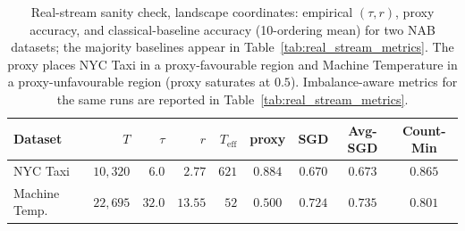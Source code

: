 \documentclass[sensors,article,submit,pdftex,moreauthors]{Definitions/mdpi}
\newcommand{\Teff}{T_{\mathrm{eff}}}
\begin{document}
\begin{table}[t]
\centering
\caption{Real-stream sanity check, landscape coordinates: empirical $(\tau, r)$, proxy accuracy, and classical-baseline accuracy (10-ordering mean) for two NAB datasets; the majority baselines appear in Table~\ref{tab:real_stream_metrics}. The proxy places NYC Taxi in a proxy-favourable region and Machine Temperature in a proxy-unfavourable region (proxy saturates at $0.5$). Imbalance-aware metrics for the same runs are reported in Table~\ref{tab:real_stream_metrics}.}
\label{tab:real_stream}
\begin{tabular}{@{}lrrrrcccc@{}}
\toprule
Dataset & $T$ & $\tau$ & $r$ & $\Teff$ & proxy & SGD & Avg-SGD & Count-Min \\
\midrule
NYC Taxi          & $10{,}320$ & $6.0$  & $2.77$  & $621$ & $0.884$ & $0.670$ & $0.673$ & $0.865$ \\
Machine Temp.\    & $22{,}695$ & $32.0$ & $13.55$ & $52$  & $0.500$ & $0.724$ & $0.735$ & $0.801$ \\
\bottomrule
\end{tabular}
\end{table}
\end{document}

